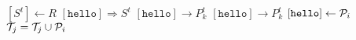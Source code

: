 \documentclass{article}
\begin{document}
\pagestyle{empty}

\newcommand{\send}{\Rightarrow}
\newcommand{\sendto}{\rightarrow}
\algrenewcommand{}

\begin{algorithmic}
  \State $[S^t] \gets R$
  \State $[\mathtt{hello}] \send S^t$
  \State $[\mathtt{hello}]\sendto P^t_k$
  \EndFor
  \State $[\mathtt{hello}] \sendto P^t_k$
  \EndFor
  \EndProcedure
  \newline
  \State $[\mathtt{hello}] \gets {\cal P}_i$
  \State ${\cal T}_j = {\cal T}_j \cup {\cal P}_i$
  \EndWhile
  \EndProcedure
  
\end{algorithmic}
\end{document}
